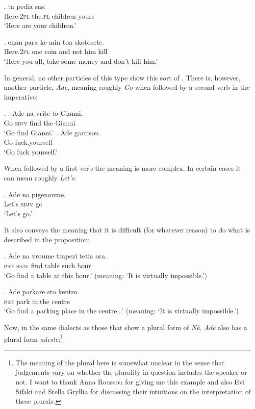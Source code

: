 \documentclass[output=paper]{LSP/langsci}
\begin{document}
\exg.
\nate ta pedia sas.\\
Here.2\textsc{pl} the.\textsc{pl} children yours\\
\glt `Here are your children.'

\exg.
\nate enan para ke min ton skotosete.\\
Here.2\textsc{pl} one coin and not him kill\\
\glt `Here you all, take some money and don't kill him.'


In general, no other particles of this type show this sort of .  There is, however, another particle, \textit{Ade}, meaning roughly \textit{Go} when followed by a second  verb in the imperative:

\Lsciex.
\ag. 
Ade na vrite to Gianni.\\
Go \textsc{sbjv} find the Gianni\\
\glt `Go find Gianni.'
\bg. Ade gamisou.\\
Go fuck.yourself\\
\glt `Go fuck yourself.'


When followed by a first  verb the meaning is more complex.  In certain cases it can mean roughly \textit{Let's}:

\exg.
Ade na pigenoume.\\
Let's \textsc{sbjv} go\\
\glt `Let's go.'

It also conveys the meaning that it is difficult (for whatever reason) to do what is described in the proposition:

\exg.
Ade na vroume trapezi tetia ora.\\
\textsc{prt} \textsc{sbjv} find table such hour\\
\glt  `Go find a table at this hour.' (meaning: `It is virtually impossible.')

\exg.
Ade parkare sto kentro.\\
\textsc{prt} park in.the centre\\
\glt `Go find a parking place in the centre...' (meaning: `It is virtually impossible.')


Now, in the same dialects as those that show a plural form of \textit{N\`{a}}, \textit{Ade} also has a plural form \textit{adeste}:\footnote{The meaning of the plural here is somewhat unclear in the sense that judgements vary on whether the plurality in {question} includes the speaker or not.  I want to thank Anna Roussou for giving me this example and also Evi Sifaki and Stella Gryllia for discussing their intuitions on the interpretation of these plurals.}
\end{document}
